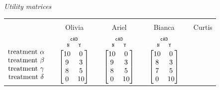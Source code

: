 \documentclass[utf8]{FrontiersinHarvard} %
\renewcommand*{\|}[1][]{\nonscript\:#1\vert\nonscript\:\mathopen{}}
\newcommand*{\cad}{\texttt{cAD}}
\newcommand*{\yes}{\texttt{Y}}
\newcommand*{\no}{\texttt{N}}
\begin{document}
\medskip
\begin{table}[!h]
  \centering
  \textit{Utility matrices}\\
  \begin{tabular}{lccccccc}
    \hline\\[-1.5\jot]
    &{\small Olivia} &&{\small Ariel} &&{\small Bianca} &&{\small Curtis}
    \\[\jot]
    $\begin{matrix}&\\[1.5\jot]
      \text{treatment }\alpha\\ 
      \text{treatment }\beta\\ 
      \text{treatment }\gamma\\ 
      \text{treatment }\delta
    \end{matrix}$
    &
    $
    \begin{gathered}
      {\scriptstyle\cad}\\[-2\jot]
      \begin{smallmatrix}
        \no\enspace &\enspace\yes
      \end{smallmatrix}\\[-\jot]
\begin{bmatrix}10&0\\9&3\\8&5\\0&10\end{bmatrix}
\end{gathered}
$
    &&
    $\begin{gathered}
      {\scriptstyle\cad}\\[-2\jot]
      \begin{smallmatrix}
        \no\enspace &\enspace\yes
      \end{smallmatrix}\\[-\jot]
      \begin{bmatrix}10&0\\9&3\\8&5\\0&10\end{bmatrix}\end{gathered}$
    &&
    $\begin{gathered}
      {\scriptstyle\cad}\\[-2\jot]
      \begin{smallmatrix}
        \no\enspace &\enspace\yes
      \end{smallmatrix}\\[-\jot]
      \begin{bmatrix}10&0\\8&3\\7&5\\0&10\end{bmatrix}\end{gathered}$

\end{tabular}
\end{table}
\end{document}
